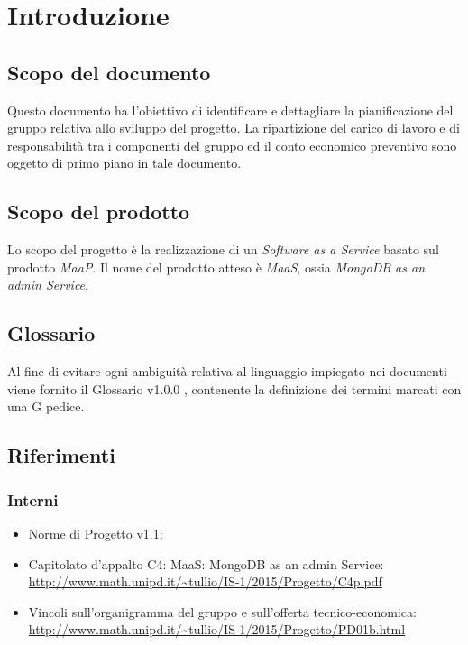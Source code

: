 \section{Introduzione}
\subsection{Scopo del documento}
Questo documento ha l’obiettivo di identificare e dettagliare la pianificazione del gruppo
relativa allo sviluppo del progetto. La ripartizione del carico di lavoro e di responsabilit\`a tra i
componenti del gruppo ed il conto economico preventivo sono oggetto di primo piano in tale documento.

\subsection{Scopo del prodotto}
Lo scopo del progetto \`e la realizzazione di un \textit{Software as a Service} basato sul prodotto \textit{MaaP}. Il nome del prodotto atteso \`e \textit{MaaS}, ossia \textit{MongoDB as an admin Service}.

\subsection{Glossario}
Al fine di evitare ogni ambiguit\`a relativa al linguaggio impiegato nei documenti viene fornito il Glossario
v1.0.0 , contenente la definizione dei termini marcati con una G pedice.

\subsection{Riferimenti}
\subsubsection{Interni}
\begin{itemize}
\item Norme di Progetto v1.1;

\item Capitolato d'appalto C4: MaaS: MongoDB as an admin Service: \\ 
\url{http://www.math.unipd.it/~tullio/IS-1/2015/Progetto/C4p.pdf}

\item Vincoli sull’organigramma del gruppo e sull’offerta tecnico-economica: \\
\url{http://www.math.unipd.it/~tullio/IS-1/2015/Progetto/PD01b.html}

\end{itemize}
